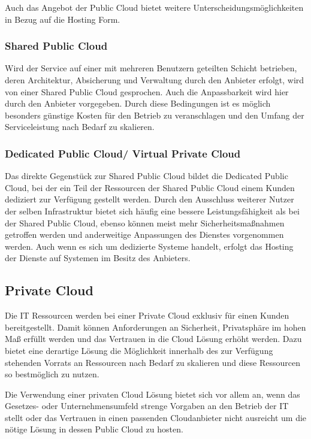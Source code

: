 \documentclass[journal]{IEEEtran}
\begin{document}
Auch das Angebot der Public Cloud bietet weitere Unterscheidungsmöglichkeiten in Bezug auf die Hosting Form.

\subsubsection{Shared Public Cloud}
Wird der Service auf einer mit mehreren Benutzern geteilten Schicht betrieben, deren Architektur, Absicherung und Verwaltung durch den Anbieter erfolgt, wird von einer Shared Public Cloud gesprochen. Auch die Anpassbarkeit wird hier durch den Anbieter vorgegeben. Durch diese Bedingungen ist es möglich besonders günstige Kosten für den Betrieb zu veranschlagen und den Umfang der Serviceleistung nach Bedarf zu skalieren. 

\subsubsection{Dedicated Public Cloud/ Virtual Private Cloud}
Das direkte Gegenstück zur Shared Public Cloud bildet die Dedicated Public Cloud, bei der ein Teil der Ressourcen der Shared Public Cloud einem Kunden dediziert zur Verfügung gestellt werden. Durch den Ausschluss weiterer Nutzer der selben Infrastruktur bietet sich häufig eine bessere Leistungsfähigkeit als bei der Shared Public Cloud, ebenso können meist mehr Sicherheitsmaßnahmen getroffen werden und anderweitige Anpassungen des Dienstes vorgenommen werden. Auch wenn es sich um dedizierte Systeme handelt, erfolgt das Hosting der Dienste auf Systemen im Besitz des Anbieters.

\subsection{Private Cloud}
Die IT Ressourcen werden bei einer Private Cloud exklusiv für einen Kunden bereitgestellt. Damit können Anforderungen an Sicherheit, Privatsphäre im hohen Maß erfüllt werden und das Vertrauen in die Cloud Lösung erhöht werden. Dazu bietet eine derartige Lösung die Möglichkeit innerhalb des zur Verfügung stehenden Vorrats an Ressourcen nach Bedarf zu skalieren und diese Ressourcen so bestmöglich zu nutzen.

Die Verwendung einer privaten Cloud Lösung bietet sich vor allem an, wenn das Gesetzes- oder Unternehmensumfeld strenge Vorgaben an den Betrieb der IT stellt oder das Vertrauen in einen passenden Cloudanbieter nicht ausreicht um die nötige Lösung in dessen Public Cloud zu hosten. 
\end{document}
